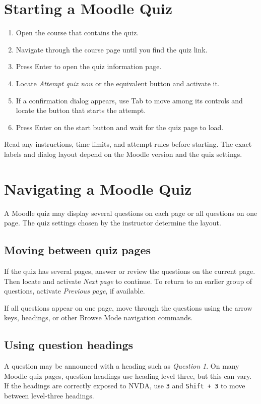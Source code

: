 \documentclass[11pt,oneside]{book}
\begin{document}
\chapter{Starting a Moodle Quiz}
\begin{enumerate}
	\item Open the course that contains the quiz.
	\item Navigate through the course page until you find the quiz link.
	\item Press Enter to open the quiz information page.
	\item Locate \textit{Attempt quiz now} or the equivalent button and activate it.
	\item If a confirmation dialog appears, use Tab to move among its controls and locate the button that starts the attempt.
	\item Press Enter on the start button and wait for the quiz page to load.
\end{enumerate}
Read any instructions, time limits, and attempt rules before starting. The exact labels and dialog layout depend on the Moodle version and the quiz settings.

\chapter{Navigating a Moodle Quiz}
A Moodle quiz may display several questions on each page or all questions on one page. The quiz settings chosen by the instructor determine the layout.

\section{Moving between quiz pages}
If the quiz has several pages, answer or review the questions on the current page. Then locate and activate \textit{Next page} to continue. To return to an earlier group of questions, activate \textit{Previous page}, if available.

If all questions appear on one page, move through the questions using the arrow keys, headings, or other Browse Mode navigation commands.

\section{Using question headings}
A question may be announced with a heading such as \textit{Question 1}. On many Moodle quiz pages, question headings use heading level three, but this can vary. If the headings are correctly exposed to NVDA, use \texttt{3} and \texttt{Shift + 3} to move between level-three headings.
\end{document}
